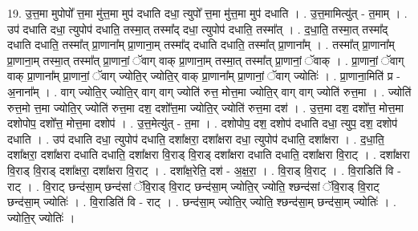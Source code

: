 \documentclass[17pt]{extarticle}
\begin{document}
19. उ॒त्त॒मा मुपोपो᳚ त्त॒मा मु॑त्त॒मा मुप॑ दधाति दधा॒ त्युपो᳚ त्त॒मा मु॑त्त॒मा मुप॑ दधाति । . उ॒त्त॒मामित्यु॑त् - त॒माम् । . उप॑ दधाति दधा॒ त्युपोप॑ दधाति॒ तस्मा॒त् तस्मा᳚द् दधा॒ त्युपोप॑ दधाति॒ तस्मा᳚त् । . द॒धा॒ति॒ तस्मा॒त् तस्मा᳚द् दधाति दधाति॒ तस्मा᳚त् प्रा॒णाना᳚म् प्रा॒णाना॒म् तस्मा᳚द् दधाति दधाति॒ तस्मा᳚त् प्रा॒णाना᳚म् । . तस्मा᳚त् प्रा॒णाना᳚म् प्रा॒णाना॒म् तस्मा॒त् तस्मा᳚त् प्रा॒णानां॒ ॅवाग् वाक् प्रा॒णाना॒म् तस्मा॒त् तस्मा᳚त् प्रा॒णानां॒ ॅवाक् । . प्रा॒णानां॒ ॅवाग् वाक् प्रा॒णाना᳚म् प्रा॒णानां॒ ॅवाग् ज्योति॒र् ज्योति॒र् वाक् प्रा॒णाना᳚म् प्रा॒णानां॒ ॅवाग् ज्योतिः॑ । . प्रा॒णाना॒मिति॑ प्र - अ॒नाना᳚म् । . वाग् ज्योति॒र् ज्योति॒र् वाग् वाग् ज्योति॑ रुत्त॒ मोत्त॒मा ज्योति॒र् वाग् वाग् ज्योति॑ रुत्त॒मा । . ज्योति॑ रुत्त॒मो त्त॒मा ज्योति॒र् ज्योति॑ रुत्त॒मा दश॒ दशो᳚त्त॒मा ज्योति॒र् ज्योति॑ रुत्त॒मा दश॑ । . उ॒त्त॒मा दश॒ दशो᳚त्त॒ मोत्त॒मा दशोपोप॒ दशो᳚त्त॒ मोत्त॒मा दशोप॑ । . उ॒त्त॒मेत्यु॑त् - त॒मा । . दशोपोप॒ दश॒ दशोप॑ दधाति दधा॒ त्युप॒ दश॒ दशोप॑ दधाति । . उप॑ दधाति दधा॒ त्युपोप॑ दधाति॒ दशा᳚क्षरा॒ दशा᳚क्षरा दधा॒ त्युपोप॑ दधाति॒ दशा᳚क्षरा । . द॒धा॒ति॒ दशा᳚क्षरा॒ दशा᳚क्षरा दधाति दधाति॒ दशा᳚क्षरा वि॒राड् वि॒राड् दशा᳚क्षरा दधाति दधाति॒ दशा᳚क्षरा वि॒राट् । . दशा᳚क्षरा वि॒राड् वि॒राड् दशा᳚क्षरा॒ दशा᳚क्षरा वि॒राट् । . दशा᳚क्ष॒रेति॒ दश॑ - अ॒क्ष॒रा॒ । . वि॒राड् वि॒राट् । . वि॒राडिति॑ वि - राट् । . वि॒राट् छन्द॑सा॒म् छन्द॑सां ॅवि॒राड् वि॒राट् छन्द॑सा॒म् ज्योति॒र् ज्योति॒ श्छन्द॑सां ॅवि॒राड् वि॒राट् छन्द॑सा॒म् ज्योतिः॑ । . वि॒राडिति॑ वि - राट् । . छन्द॑सा॒म् ज्योति॒र् ज्योति॒ श्छन्द॑सा॒म् छन्द॑सा॒म् ज्योतिः॑ । . ज्योति॒र् ज्योतिः॑ । \newline
\end{document}
